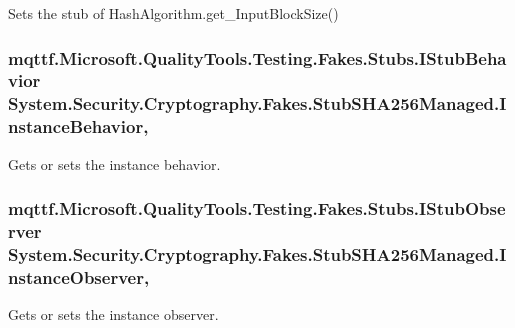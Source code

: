 Sets the stub of Hash\-Algorithm.\-get\-\_\-\-Input\-Block\-Size()

\hypertarget{class_system_1_1_security_1_1_cryptography_1_1_fakes_1_1_stub_s_h_a256_managed_a1e3b88e269f6a103ad0da2faaa4a373a}{
\subsubsection[{Instance\-Behavior}]{\setlength{\rightskip}{0pt plus 5cm}mqttf.\-Microsoft.\-Quality\-Tools.\-Testing.\-Fakes.\-Stubs.\-I\-Stub\-Behavior System.\-Security.\-Cryptography.\-Fakes.\-Stub\-S\-H\-A256\-Managed.\-Instance\-Behavior\hspace{0.3cm}{\ttfamily [get]}, {\ttfamily [set]}}}\label{class_system_1_1_security_1_1_cryptography_1_1_fakes_1_1_stub_s_h_a256_managed_a1e3b88e269f6a103ad0da2faaa4a373a}


Gets or sets the instance behavior.

\hypertarget{class_system_1_1_security_1_1_cryptography_1_1_fakes_1_1_stub_s_h_a256_managed_ae40902458a93c2bef0cf6bcd4df1d415}{
\subsubsection[{Instance\-Observer}]{\setlength{\rightskip}{0pt plus 5cm}mqttf.\-Microsoft.\-Quality\-Tools.\-Testing.\-Fakes.\-Stubs.\-I\-Stub\-Observer System.\-Security.\-Cryptography.\-Fakes.\-Stub\-S\-H\-A256\-Managed.\-Instance\-Observer\hspace{0.3cm}{\ttfamily [get]}, {\ttfamily [set]}}}\label{class_system_1_1_security_1_1_cryptography_1_1_fakes_1_1_stub_s_h_a256_managed_ae40902458a93c2bef0cf6bcd4df1d415}


Gets or sets the instance observer.

